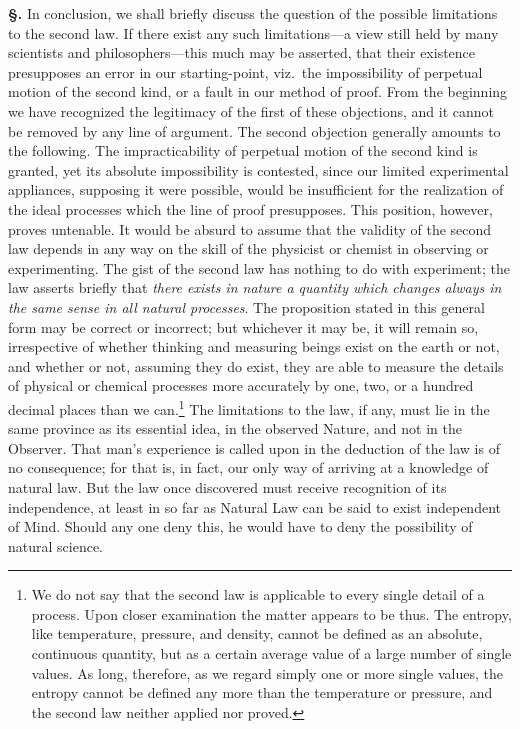 \documentclass[12pt]{book}[2005/09/16]
\newcommand{\Section}[1]{
  \medskip\par\textbf{§\;#1}
  \label{section:#1}
}
\newcommand{\PageSep}[1]{\ignorespaces}
\begin{document}
\Section{136.} In conclusion, we shall briefly discuss the question
%
of the possible limitations to the second law. If there exist
any such limitations---a view still held by many scientists
and philosophers---this much may be asserted, that their
existence presupposes an error in our starting-point, viz.\
the impossibility of perpetual motion of the second kind, or
a fault in our method of proof. From the beginning we
have recognized the legitimacy of the first of these objections,
and it cannot be removed by any line of argument. The
second objection generally amounts to the following. The
impracticability of perpetual motion of the second kind is
granted, yet its absolute impossibility is contested, since our
limited experimental appliances, supposing it were possible,
would be insufficient for the realization of the ideal processes
which the line of proof presupposes. This position, however,
proves untenable. It would be absurd to assume that the
validity of the second law depends in any way on the skill
of the physicist or chemist in observing or experimenting.
The gist of the second law has nothing to do with experiment;
the law asserts briefly that \emph{there exists in nature a
quantity which changes always in the same sense in all natural
processes}. The proposition stated in this general form may be
correct or incorrect; but whichever it may be, it will remain
so, irrespective of whether thinking and measuring beings
exist on the earth or not, and whether or not, assuming
they do exist, they are able to measure the details of physical
or chemical processes more accurately by one, two, or a
hundred decimal places than we can.\footnote
  {We do not say that the second law is applicable to every single
  detail of a process. Upon closer examination the matter appears to be thus.
  The entropy, like temperature, pressure, and density, cannot be defined as an
  absolute, continuous quantity, but as a certain average value of a large
  number of single values. As long, therefore, as we regard simply one or
  more single values, the entropy cannot be defined any more than the
  temperature or pressure, and the second law neither applied nor proved.}
The limitations
to the law, if any, must lie in the same province as its
essential idea, in the observed Nature, and not in the
Observer. That man's experience is called upon in the deduction
of the law is of no consequence; for that is, in fact,
\PageSep{104}
our only way of arriving at a knowledge of natural law.
But the law once discovered must receive recognition of its
independence, at least in so far as Natural Law can be said
to exist independent of Mind. Should any one deny this,
he would have to deny the possibility of natural science.
\end{document}
